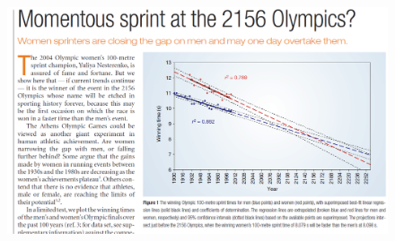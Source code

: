 \documentclass[12pt]{notes}
\begin{document}
\begin{figure}[H]
\centering
\includegraphics[width=\textwidth]{figures/module2/sprint.png}
\end{figure}













\end{document}
